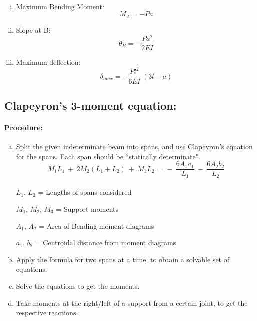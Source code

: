 \documentclass{article}
\begin{document}
{
\\
\begin{enumerate}[(i)]
\item Maximum Bending Moment: {\LARGE $$M_A=-Pa$$}
\item Slope at B: {\LARGE $$\theta_B=-\frac{Pa^2}{2EI}$$}
\item Maximum deflection:
{\LARGE $$\delta_{max}=-\frac{Pl^2}{6EI}\ (3l-a)$$}
\end{enumerate}
\newpage
\subsection{\LARGE Clapeyron's 3-moment equation:}
\paragraph{\Large Procedure:}
\begin{enumerate}[(a)]
\item Split the given indeterminate beam into spans, and use Clapeyron's equation for the spans. Each span should be ``statically determinate".
{\LARGE $$M_1L_1\ +\ 2M_2(L_1+L_2)\ +\ M_3L_2=\ -\ \frac{6A_1a_1}{L_1}\ -\ \frac{6A_2b_2}{L_2}$$}
\\
{\LARGE $L_1$, $L_2$} = Lengths of spans considered

{\LARGE $M_1$, $M_2$, $M_3$} = Support moments

{\LARGE $A_1$, $A_2$} = Area of Bending moment diagrams

{\LARGE $a_1$, $b_2$} = Centroidal distance from moment diagrams
\\
\item Apply the formula for two spans at a time, to obtain a solvable set of equations.
\item Solve the equations to get the moments.
\item Take moments at the right/left of a support from a certain joint, to get the respective reactions.
\end{enumerate}
}
\end{document}
